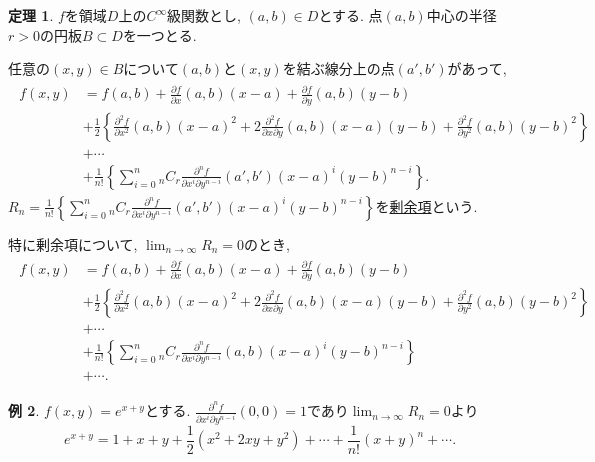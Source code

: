 \documentclass[dvipdfmx,a4paper,11pt]{article}
\theoremstyle{definition}
\newtheorem{thm}{定理}
\newtheorem{exa}[thm]{例}
\newcommand{\pdrv}[2]{\frac{\partial #1}{\partial #2}}
\newcommand{\ppdrv}[3]{\frac{\partial #1}{\partial #2 \partial #3}}
\begin{document}
    
\begin{tcolorbox}[
    colback = white,
    colframe = green!35!black,
    fonttitle = \bfseries,
    breakable = true]
    \begin{thm}
    $f$を領域$D$上の$C^{\infty}$級関数とし, $(a,b)  \in D$とする.
    点$(a,b)$中心の半径$r>0$の円板$B \subset D$を一つとる.
    
    任意の$(x,y) \in B$について$(a,b)$と$(x,y) $を結ぶ線分上の点$(a',b')$があって,
  \begin{align*}
  \begin{split}
  f(x,y) &= f(a,b) + \pdrv{f}{x}(a,b)(x-a) + \pdrv{f}{y}(a,b)(y-b) \\
  &+ \frac{1}{2} \left\{  \pdrv{^2f}{x^2}(a,b)(x-a)^2 +2 \ppdrv{^2f}{x}{y}(a,b)(x-a)(y-b)+
   \pdrv{^2f}{y^2}(a,b)(y-b) ^2    \right\}\\
   &+ \cdots \\
   &+ \frac{1}{n!}\left\{ \sum_{i=0}^{n} {}_n C_r \ppdrv{^n f}{x^i }{ y^{n-i}} (a', b') (x-a)^{i}(y-b)^{n-i}\right\}.
    \end{split}
  \end{align*}
$ R_n = \frac{1}{n!}\left\{ \sum_{i=0}^{n} {}_n C_r \ppdrv{^n f}{x^i }{ y^{n-i}} (a', b') (x-a)^{i}(y-b)^{n-i}\right\}$を\underline{剰余項}という.

特に剰余項について, $\lim_{n \rightarrow \infty} R_n = 0$のとき, 
  \begin{align*}
  \begin{split}
  f(x,y) &= f(a,b) + \pdrv{f}{x}(a,b)(x-a) + \pdrv{f}{y}(a,b)(y-b) \\
  &+ \frac{1}{2} \left\{  \pdrv{^2f}{x^2}(a,b)(x-a)^2 +2 \ppdrv{^2f}{x}{y}(a,b)(x-a)(y-b)+
   \pdrv{^2f}{y^2}(a,b)(y-b) ^2    \right\}\\
   &+ \cdots \\
   &+ \frac{1}{n!}\left\{ \sum_{i=0}^{n} {}_n C_r \ppdrv{^n f}{x^i }{ y^{n-i}} (a, b) (x-a)^{i}(y-b)^{n-i}\right\} \\
   &+ \cdots .
    \end{split}
  \end{align*}
    \end{thm}
    \end{tcolorbox}

\begin{exa}
$f(x,y) = e^{x+y}$とする.
$\ppdrv{^n f}{x^i }{ y^{n-i}}(0,0) =1 $であり$\lim_{n \rightarrow \infty} R_n = 0$より
$$
 e^{x+y} = 1 + x+ y 
  + \frac{1}{2} \left (x^2 + 2xy +y^2    \right)
   + \cdots 
   + \frac{1}{n!} \left (x +y    \right)^n
  + \cdots .
$$
\end{exa}


 
\end{document}
